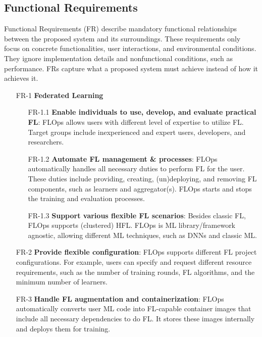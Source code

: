 \subsection{Functional Requirements}
Functional Requirements (FR) describe mandatory functional relationships between the proposed system and its surroundings.
These requirements only focus on concrete functionalities, user interactions, and environmental conditions.
They ignore implementation details and nonfunctional conditions, such as performance.
FRs capture what a proposed system must achieve instead of how it achieves it. \cite{book:bruegge}

\begin{itemize}
    \item [FR-1] {\textbf{Federated Learning}} \label{FR-1}
        \begin{itemize}
        \item [FR-1.1] \textbf{Enable individuals to use, develop, and evaluate practical FL}: \label{FR-1.1}
            FLOps allows users with different level of expertise to utilize FL.
            Target groups include inexperienced and expert users, developers, and researchers.
        \item [FR-1.2] \textbf{Automate FL management \& processes}: \label{FR-1.2}
            FLOps automatically handles all necessary duties to perform FL for the user.
            These duties include providing, creating, (un)deploying, and removing FL components, such as learners and aggregator(s).
            FLOps starts and stops the training and evaluation processes.
        \item [FR-1.3] \textbf{Support various flexible FL scenarios}: \label{FR-1.3}
            Besides classic FL, FLOps supports (clustered) HFL.
            FLOps is ML library/framework agnostic, allowing different ML techniques, such as DNNs and classic ML.
        \end{itemize}
    \item [FR-2] {\textbf{Provide flexible configuration}}: \label{FR-2}
        FLOps supports different FL project configurations.
        For example, users can specify and request different resource requirements, such as the number of training rounds, FL algorithms, and the minimum number of learners.
    \item [FR-3] {\textbf{Handle FL augmentation and containerization}}: \label{FR-3}
        FLOps automatically converts user ML code into FL-capable container images that include all necessary dependencies to do FL.
        It stores these images internally and deploys them for training.

\end{itemize}
